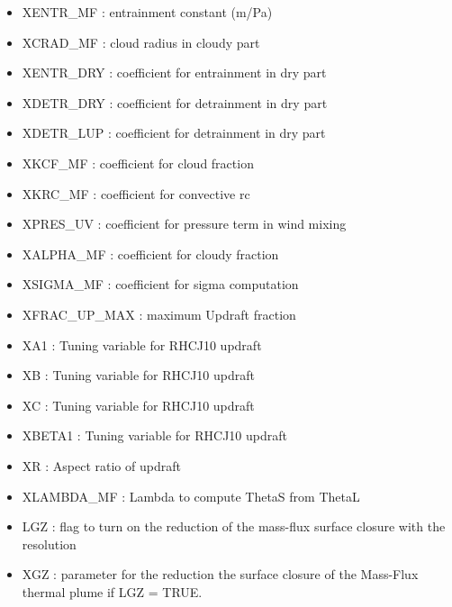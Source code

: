 \begin{itemize}
\item
{}
XENTR\_MF : entrainment constant (m/Pa)
\item
{}
XCRAD\_MF : cloud radius in cloudy part
\item
{}
XENTR\_DRY : coefficient for entrainment in dry part
\item
{}
XDETR\_DRY : coefficient for detrainment in dry part
\item
{}
XDETR\_LUP : coefficient for detrainment in dry part
\item
{}
XKCF\_MF : coefficient for cloud fraction
\item
{}
XKRC\_MF : coefficient for convective rc
{}
\item
{}
XPRES\_UV : coefficient for pressure term in wind mixing
\item
{}
XALPHA\_MF : coefficient for cloudy fraction
\item
{}
XSIGMA\_MF : coefficient for sigma computation
\item
{}
XFRAC\_UP\_MAX : maximum Updraft fraction
\item
{}
XA1 : Tuning variable for RHCJ10 updraft 
\item
{}
XB : Tuning variable for RHCJ10 updraft
\item
{}
XC : Tuning variable for RHCJ10 updraft
\item
{}
XBETA1 : Tuning variable for RHCJ10 updraft
\item
{}
XR : Aspect ratio of updraft
\item
{}
XLAMBDA\_MF : Lambda to compute ThetaS from ThetaL
\item
{}
LGZ : flag to turn on the reduction of the mass-flux surface closure with the resolution
\item
{}
XGZ : parameter for the reduction the surface closure of the Mass-Flux thermal plume if LGZ = TRUE.
\end{itemize}
